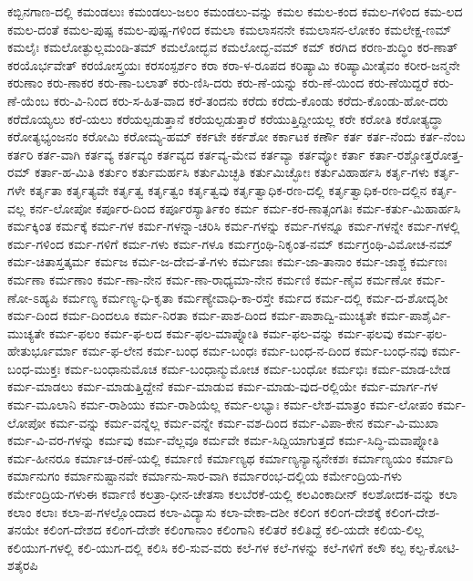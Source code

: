 {ಕಬ್ಬಿನಗಾಣ-ದಲ್ಲಿ
ಕಮಂಡಲುಃ
ಕಮಂಡಲು-ಜಲಂ
ಕಮಂಡಲು-ವನ್ನು
ಕಮಲ
ಕಮಲ-ಕಂದ
ಕಮಲ-ಗಳಿಂದ
ಕಮ-ಲದ
ಕಮಲ-ದಂತೆ
ಕಮಲ-ಪುಷ್ಪ
ಕಮಲ-ಪುಷ್ಪ-ಗಳಿಂದ
ಕಮಲಾ
ಕಮಲಾಸನನೇ
ಕಮಲಾಸನ-ಲೋಕಂ
ಕಮಲೇಕ್ಷ-ಣಮ್
ಕಮಲೈಃ
ಕಮಲೋತ್ಫುಲ್ಲಮಂಡಿ-ತಮ್
ಕಮಲೋದ್ಭವ
ಕಮಲೋದ್ಭ-ವಮ್
ಕಮ್
ಕರಗಿದ
ಕರಣ-ಶುದ್ಧಿಂ
ಕರ-ಣಾತ್
ಕರಯೊರ್ಭವೇತ್
ಕರಯೋಸ್ತ್ರಯಃ
ಕರಸಂಸ್ಪರ್ಶಂ
ಕರಾ
ಕರಾ-ಳ-ರೂಪದ
ಕರಿಷ್ಯಾಮಿ
ಕರಿಷ್ಯಾಮೀತೈವಂ
ಕರೀರ-ಜನ್ಮನೇ
ಕರುಣಾಂ
ಕರು-ಣಾಕರ
ಕರು-ಣಾ-ಬಲಾತ್
ಕರು-ಣಿಸಿ-ದರು
ಕರು-ಣೆ-ಯನ್ನು
ಕರು-ಣೆ-ಯಿಂದ
ಕರು-ಣೆಯಿದ್ದರೆ
ಕರು-ಣೆ-ಯೆಂಬ
ಕರು-ವಿ-ನಿಂದ
ಕರು-ಸ-ಹಿತ-ವಾದ
ಕರೆ-ತಂದನು
ಕರೆದು
ಕರೆದು-ಕೊಂಡು
ಕರೆದು-ಕೊಂಡು-ಹೋ-ದರು
ಕರೆದೊಯ್ಯಲು
ಕರೆ-ಯಲು
ಕರೆಯಲ್ಪಡುತ್ತಾನೆ
ಕರೆಯಲ್ಪಡುತ್ತಾರೆ
ಕರೆಯುತ್ತಿದ್ದೀಯಲ್ಲ
ಕರೇ
ಕರೋತಿ
ಕರೋತ್ಯದ್ಧಾ
ಕರೋತ್ಯಭ್ಯಂಜನಂ
ಕರೋಮಿ
ಕರೋಮ್ಯ-ಹಮ್
ಕರ್ಕಟೇ
ಕರ್ಕಶೋ
ಕರ್ಕಾಟಕ
ಕರ್ಣೌ
ಕರ್ತ
ಕರ್ತ-ನೆಂದು
ಕರ್ತ-ನೆಂಬ
ಕರ್ತರಿ
ಕರ್ತ-ವಾಗಿ
ಕರ್ತವ್ಯ
ಕರ್ತವ್ಯಂ
ಕರ್ತವ್ಯದ
ಕರ್ತವ್ಯ-ಮೇವ
ಕರ್ತವ್ಯಾ
ಕರ್ತವ್ಯೋ
ಕರ್ತಾ
ಕರ್ತಾ-ರಶ್ಚೋತ್ತರೋತ್ತ-ರಮ್
ಕರ್ತಾ-ಹ-ಮಿತಿ
ಕರ್ತುಂ
ಕರ್ತುಮರ್ಹಸಿ
ಕರ್ತುಮಿಚ್ಛತಿ
ಕರ್ತುಮಿಚ್ಛೋಃ
ಕರ್ತುವಿಹಾರ್ಹಸಿ
ಕರ್ತೃ-ಗಳು
ಕರ್ತೃ-ಗಳೇ
ಕರ್ತೃತಾ
ಕರ್ತೃತ್ಯವೇ
ಕರ್ತೃತ್ವ
ಕರ್ತೃತ್ವಂ
ಕರ್ತೃತ್ವವು
ಕರ್ತೃತ್ವಾಧಿಕ-ರಣ-ದಲ್ಲಿ
ಕರ್ತೃತ್ವಾಧಿಕ-ರಣ-ದಲ್ಲಿನ
ಕರ್ತೃ-ವಲ್ಲ
ಕರ್ನ-ಲೋಪೋ
ಕರ್ಪೂರ-ದಿಂದ
ಕರ್ಪೂರಸ್ಯಾರ್ತಿಕಂ
ಕರ್ಮ
ಕರ್ಮ-ಕರ-ಣಾತ್ಸಂಗತಿಃ
ಕರ್ಮ-ಕರ್ತು-ಮಿಹಾರ್ಹಸಿ
ಕರ್ಮಕ್ಕಿಂತ
ಕರ್ಮಕ್ಕೆ
ಕರ್ಮ-ಗಳ
ಕರ್ಮ-ಗಳನ್ನಾ-ಚರಿಸಿ
ಕರ್ಮ-ಗಳನ್ನು
ಕರ್ಮ-ಗಳನ್ನೂ
ಕರ್ಮ-ಗಳನ್ನೇ
ಕರ್ಮ-ಗಳಲ್ಲಿ
ಕರ್ಮ-ಗಳಿಂದ
ಕರ್ಮ-ಗಳಿಗೆ
ಕರ್ಮ-ಗಳು
ಕರ್ಮ-ಗಳೂ
ಕರ್ಮಗ್ರಂಥಿ-ನಿಕೃಂತ-ನಮ್
ಕರ್ಮಗ್ರಂಥಿ-ವಿಮೋಚ-ನಮ್
ಕರ್ಮ-ಚಿತಾಸ್ತತ್ಕರ್ಮ
ಕರ್ಮಜ
ಕರ್ಮ-ಜ-ದೇವ-ತೆ-ಗಳು
ಕರ್ಮಜಾಃ
ಕರ್ಮ-ಜಾ-ತಾನಾಂ
ಕರ್ಮ-ಜಾಶ್ಚ
ಕರ್ಮಣಃ
ಕರ್ಮಣಾ
ಕರ್ಮಣಾಂ
ಕರ್ಮ-ಣಾ-ನೇನ
ಕರ್ಮ-ಣಾ-ರಾಧ್ಯಮಾ-ನೇನ
ಕರ್ಮಣಿ
ಕರ್ಮ-ಣೈವ
ಕರ್ಮಣೋ
ಕರ್ಮ-ಣೋ-ಽಹ್ಯಪಿ
ಕರ್ಮಣ್ಯ
ಕರ್ಮಣ್ಯ-ಧಿ-ಕೃತಾ
ಕರ್ಮಣ್ಯೇವಾಧಿ-ಕಾ-ರಸ್ತೇ
ಕರ್ಮದ
ಕರ್ಮ-ದಲ್ಲಿ
ಕರ್ಮ-ದ-ಶೋದೃಶೀ
ಕರ್ಮ-ದಿಂದ
ಕರ್ಮ-ದಿಂದಲೂ
ಕರ್ಮ-ನಿರತಾ
ಕರ್ಮ-ಪಾಶ-ದಿಂದ
ಕರ್ಮ-ಪಾಶಾದ್ವಿ-ಮುಚ್ಯತೇ
ಕರ್ಮ-ಪಾಶೈರ್ವಿ-ಮುಚ್ಯತೇ
ಕರ್ಮ-ಫಲಂ
ಕರ್ಮ-ಫ-ಲದ
ಕರ್ಮ-ಫಲ-ಮಾಪ್ನೋತಿ
ಕರ್ಮ-ಫಲ-ವನ್ನು
ಕರ್ಮ-ಫಲವು
ಕರ್ಮ-ಫಲ-ಹೇತುರ್ಭೂರ್ಮಾ
ಕರ್ಮ-ಫ-ಲೇನ
ಕರ್ಮ-ಬಂಧ
ಕರ್ಮ-ಬಂಧಃ
ಕರ್ಮ-ಬಂಧ-ನ-ದಿಂದ
ಕರ್ಮ-ಬಂಧ-ನವು
ಕರ್ಮ-ಬಂಧ-ಮುಕ್ತಃ
ಕರ್ಮ-ಬಂಧಾನುಮೊಚ
ಕರ್ಮ-ಬಂಧಾನ್ಮುಮೋಚ
ಕರ್ಮ-ಬಂಧೋ
ಕರ್ಮಭಿಃ
ಕರ್ಮ-ಮಾಡ-ಬೇಡ
ಕರ್ಮ-ಮಾಡಲು
ಕರ್ಮ-ಮಾಡುತ್ತಿದ್ದೇನೆ
ಕರ್ಮ-ಮಾಡುವ
ಕರ್ಮ-ಮಾಡು-ವುದ-ರಲ್ಲಿಯೇ
ಕರ್ಮ-ಮಾರ್ಗ-ಗಳ
ಕರ್ಮ-ಮೂಲಾನಿ
ಕರ್ಮ-ರಾಶಿಯು
ಕರ್ಮ-ರಾಶಿಯೆಲ್ಲ
ಕರ್ಮ-ಲಭ್ಯಾಃ
ಕರ್ಮ-ಲೇಶ-ಮಾತ್ರಂ
ಕರ್ಮ-ಲೋಪಂ
ಕರ್ಮ-ಲೋಪೋ
ಕರ್ಮ-ವನ್ನು
ಕರ್ಮ-ವನ್ನೆಲ್ಲ
ಕರ್ಮ-ವನ್ನೇ
ಕರ್ಮ-ವಶ-ದಿಂದ
ಕರ್ಮ-ವಿಪಾ-ಕೇನ
ಕರ್ಮ-ವಿ-ಮುಖಾ
ಕರ್ಮ-ವಿ-ವರ-ಗಳನ್ನು
ಕರ್ಮವು
ಕರ್ಮ-ವೆಲ್ಲವೂ
ಕರ್ಮವೇ
ಕರ್ಮ-ಸಿದ್ದಿಯಾಗುತ್ತದೆ
ಕರ್ಮ-ಸಿದ್ಧಿ-ಮವಾಪ್ನೋತಿ
ಕರ್ಮ-ಹೀನರೂ
ಕರ್ಮಾಚ-ರಣೆ-ಯಲ್ಲಿ
ಕರ್ಮಾಣಿ
ಕರ್ಮಾಣ್ಯಥ
ಕರ್ಮಾಣ್ಯನ್ಯಾನ್ಯನೇಕಶಃ
ಕರ್ಮಾಣ್ಯಯಂ
ಕರ್ಮಾದಿ
ಕರ್ಮಾನುಗಂ
ಕರ್ಮಾನುಷ್ಟಾನವೇ
ಕರ್ಮಾನು-ಸಾರ-ವಾಗಿ
ಕರ್ಮಾರಂಭ-ದಲ್ಲಿಯ
ಕರ್ಮೇಂದ್ರಿಯ-ಗಳು
ಕರ್ಮೇಂದ್ರಿಯ-ಗಳುಈ
ಕರ್ವಾಣಿ
ಕಲತ್ರಾ-ಧೀನ-ಚೇತಸಾ
ಕಲಬೆರಕೆ-ಯಲ್ಲಿ
ಕಲವಿಂಕಾದೀನ್
ಕಲಶೋದಕ-ವನ್ನು
ಕಲಾ
ಕಲಾಂ
ಕಲಾಃ
ಕಲಾ-ಪ-ಗಳಲ್ಲೊಂದಾದ
ಕಲಾ-ವಿದ್ಯಾಸು
ಕಲಾ-ವೇಕಾ-ದಶೀ
ಕಲಿಂಗ
ಕಲಿಂಗ-ದೇಶಕ್ಕೆ
ಕಲಿಂಗ-ದೇಶ-ತನಯೇ
ಕಲಿಂಗ-ದೇಶದ
ಕಲಿಂಗ-ದೇಶೇ
ಕಲಿಂಗಾನಾಂ
ಕಲಿಂಗಾನಿ
ಕಲಿತರೆ
ಕಲಿತಿದ್ದೆ
ಕಲಿ-ಯದೇ
ಕಲಿಯ-ಲಿಲ್ಲ
ಕಲಿಯುಗ-ಗಳಲ್ಲಿ
ಕಲಿ-ಯುಗ-ದಲ್ಲಿ
ಕಲಿಸಿ
ಕಲಿ-ಸುವ-ವರು
ಕಲೆ-ಗಳ
ಕಲೆ-ಗಳನ್ನು
ಕಲೆ-ಗಳಿಗೆ
ಕಲೌ
ಕಲ್ಪ
ಕಲ್ಪ-ಕೋಟಿ-ಶತೈರಪಿ
}
